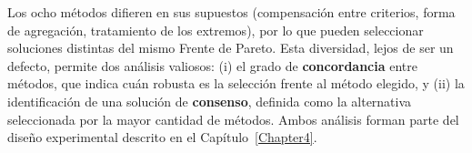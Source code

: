 Los ocho métodos difieren en sus supuestos (compensación entre criterios, forma de agregación, tratamiento de los extremos), por lo que pueden seleccionar soluciones distintas del mismo Frente de Pareto. Esta diversidad, lejos de ser un defecto, permite dos análisis valiosos: (i) el grado de \textbf{concordancia} entre métodos, que indica cuán robusta es la selección frente al método elegido, y (ii) la identificación de una solución de \textbf{consenso}, definida como la alternativa seleccionada por la mayor cantidad de métodos. Ambos análisis forman parte del diseño experimental descrito en el Capítulo~\ref{Chapter4}.
